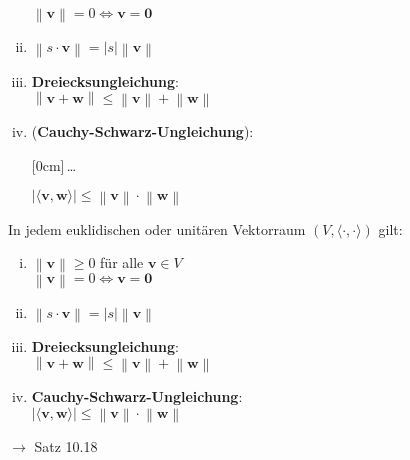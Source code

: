 \documentclass[11pt]{article}
\renewcommand{\cite}[1]{\par\bigskip\hfill{\color{gray}\tiny\(\to\) #1}}
\newcommand*{\abs}[1]{\left\vert#1\right\vert}
\newcommand*{\norm}[1]{\left\|#1\right\|}
\newcommand*{\scprod}[2]{\langle #1, #2\rangle} %
\renewcommand{\leq}{\leqslant}
\renewcommand{\geq}{\geqslant}
\renewcommand{\vec}[1]{\mathbf{#1}}
\newcommand{\hide}[1]{\parbox{0cm}{\raisebox{-7pt}[0cm]{\dots}}\color{white}#1\color{black}}
\newcommand{\hint}[1]{{\color{lightgray}(#1)}}
\let\olddots\dots
\renewcommand{\dots}{\,\olddots\,}
\newenvironment{field}{}{\newpage}
\newif\ifnote
\newenvironment{note}{\notetrue}{\notefalse}
\begin{document}
\begin{note}
\begin{field}
\begin{enumerate}[(i)]
                  \(\norm{\vec{v}} = 0 \Leftrightarrow \vec{v} = \vec{0}\)
            \item \(\norm{s\cdot\vec{v}} = \abs{s}\norm{\vec{v}}\)
            \item \textbf{Dreiecksungleichung}:\\
                  \(\norm{\vec{v}+ \vec{w}} \leq \norm{\vec{v}} + \norm{\vec{w}}\)
            \item \hint{\textbf{Cauchy-Schwarz-Ungleichung}}:\\
                  \hide{\(\abs{\scprod{\vec{v}}{\vec{w}}} \leq \norm{\vec{v}}\cdot\norm{\vec{w}}\)}
        \end{enumerate}
    \end{field}
    \begin{field}
        In jedem euklidischen oder unitären Vektorraum \((V, \scprod{\cdot}{\cdot})\) gilt:
        \begin{enumerate}[(i)]
            \item \(\norm{\vec{v}} \geq 0\) für alle \(\vec{v}\in V\) \\
                  \(\norm{\vec{v}} = 0 \Leftrightarrow \vec{v} = \vec{0}\)
            \item \(\norm{s\cdot\vec{v}} = \abs{s}\norm{\vec{v}}\)
            \item \textbf{Dreiecksungleichung}:\\
                  \(\norm{\vec{v}+ \vec{w}} \leq \norm{\vec{v}} + \norm{\vec{w}}\)
            \item \textbf{Cauchy-Schwarz-Ungleichung}:\\
                  \(\abs{\scprod{\vec{v}}{\vec{w}}} \leq \norm{\vec{v}}\cdot\norm{\vec{w}}\)
        \end{enumerate}
        \cite{Satz 10.18}
    \end{field}
\end{note}
\end{document}
